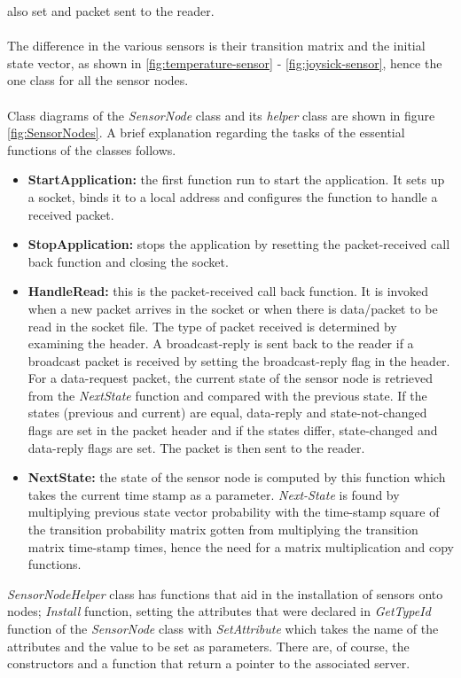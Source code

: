 also set and packet sent to the reader.\\\\
The difference in the various sensors is their transition matrix and the initial
state vector, as shown in \ref{fig:temperature-sensor} - \ref{fig:joysick-sensor},
hence the one class for all the sensor nodes.\\\\
Class diagrams of the \textit{SensorNode} class and its \textit{helper} class are
shown in figure \ref{fig:SensorNodes}. A brief explanation regarding the tasks of
the essential functions of the classes follows.
\begin{itemize}
\renewcommand{\labelitemi}{}
\item \textbf{StartApplication:} the first function run to start the application.
    It sets up a socket, binds it to a local address and configures the function
    to handle a received packet.
\item \textbf{StopApplication:} stops the application by resetting the
    packet-received call back function and closing the socket.
\item \textbf{HandleRead:} this is the packet-received call back function. It is
    invoked when a new packet arrives in the socket or when there is data/packet
    to be read in the socket file. The type of packet received is determined by
    examining the header. A broadcast-reply is sent back to the reader if a broadcast
    packet is received by setting the broadcast-reply flag in the header. For a
    data-request packet, the current state of the sensor node is retrieved from the
    \textit{NextState} function and compared with the previous state. If the states
    (previous and current) are equal, data-reply and state-not-changed flags are set
    in the packet header and if the states differ, state-changed and data-reply
    flags are set. The packet is then sent to the reader.
\item \textbf{NextState:} the state of the sensor node is computed by this function
    which takes the current time stamp as a parameter. \textit{Next-State} is found
    by multiplying previous state vector probability with the time-stamp square of
    the transition probability matrix gotten from multiplying the transition matrix
    time-stamp times, hence the need for a matrix multiplication and copy functions.
\end{itemize}
\textit{SensorNodeHelper} class has functions that aid in the installation of sensors
onto nodes; \textit{Install} function, setting the attributes that were declared in
\textit{GetTypeId} function of the \textit{SensorNode} class with \textit{SetAttribute}
which takes the name of the attributes and the value to be set as parameters. There
are, of course, the constructors and a function that return a pointer to the
associated server.

